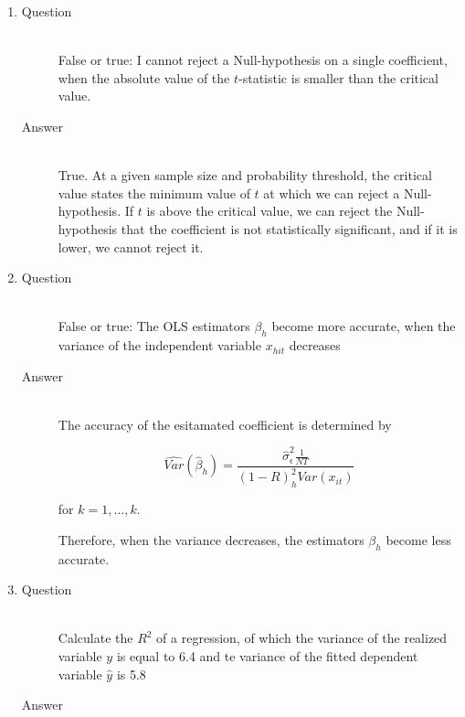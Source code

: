 \documentclass{article}
\begin{document}
\begin{enumerate}
  \item
  \begin{description}
    \item[Question] \hfill \\
    False or true: I cannot reject a Null-hypothesis on a single coefficient, when the absolute value of the $t$-statistic is smaller than the critical value.
    \item[Answer] \hfill \\
    True. At a given sample size and probability threshold, the critical value states the minimum value of $t$ at which we can reject a Null-hypothesis. If $t$ is above the critical value, we can reject the Null-hypothesis that the coefficient is not statistically significant, and if it is lower, we cannot reject it.
  \end{description}
  
  \item
  \begin{description}
    \item[Question] \hfill \\
    False or true: The OLS estimators $\beta_h$ become more accurate, when the variance of the independent variable $x_{hit}$ decreases
    \item[Answer] \hfill \\
    The accuracy of the esitamated coefficient is determined by 
    
    $$\hat{Var}(\hat{\beta}_{h}) = \frac{\hat{\sigma}_{\epsilon}^{2} \frac{1}{NT}} {(1 - R)^{2}_{h}Var(x_{it}) }$$ 
    
    for $k = 1,\ldots,k$.
    
    Therefore, when the variance decreases, the estimators $\beta_h$ become less accurate.
    
  \end{description}
  
  \item
  \begin{description}
    \item[Question] \hfill \\
    Calculate the $R^2$ of a regression, of which the variance of the realized variable $y$ is equal to 6.4 and te variance of the fitted dependent variable $\hat{y}$ is 5.8
    \item[Answer] \hfill \\

  \end{description}
  

\end{enumerate}
\end{document}

